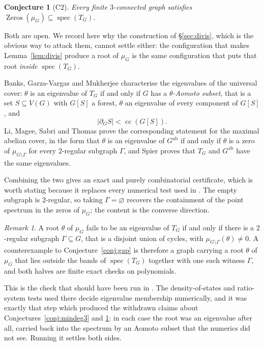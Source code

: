 \documentclass[11pt]{article}
\newtheorem{conjecture}[theorem]{Conjecture}
\theoremstyle{remark}
\newtheorem{remark}[theorem]{Remark}
\begin{document}
\begin{conjecture}[C2]\label{conj:c2}
Every finite $3$-connected graph satisfies
$\operatorname{Zeros}(\mu_G)\subseteq\operatorname{spec}(T_G)$.
\end{conjecture}

Both are open. We record here why the construction of \S\ref{sec:divis}, which is the obvious way to
attack them, cannot settle either: the configuration that makes Lemma~\ref{lem:divis} produce a root
of $\mu_G$ is the same configuration that puts that root \emph{inside} $\operatorname{spec}(T_G)$.

Banks, Garza-Vargas and Mukherjee \cite{BGM} characterise the eigenvalues of the universal cover:
$\theta$ is an eigenvalue of $T_G$ if and only if $G$ has a \emph{$\theta$-Aomoto subset}, that is a
set $S\subseteq V(G)$ with $G[S]$ a forest, $\theta$ an eigenvalue of every component of $G[S]$, and
\[
  |\partial_G S|<\operatorname{cc}(G[S]).
\]
Li, Magee, Sabri and Thomas \cite{LMST} prove the corresponding statement for the maximal abelian
cover, in the form that $\theta$ is an eigenvalue of $G^{\mathrm{ab}}$ if and only if $\theta$ is a
zero of $\mu_{G\setminus\Gamma}$ for every $2$-regular subgraph $\Gamma$, and Spier \cite{Sp} proves
that $T_G$ and $G^{\mathrm{ab}}$ have the same eigenvalues.

Combining the two gives an exact and purely combinatorial certificate, which is worth stating
because it replaces every numerical test used in \cite{Supp}. The empty subgraph is $2$-regular, so
taking $\Gamma=\varnothing$ recovers the containment of the point spectrum in the zeros of $\mu_G$;
the content is the converse direction.

\begin{remark}\label{rem:certificate}
A root $\theta$ of $\mu_G$ fails to be an eigenvalue of $T_G$ if and only if there is a $2$-regular
subgraph $\Gamma\subseteq G$, that is a disjoint union of cycles, with $\mu_{G\setminus\Gamma}(\theta)\ne0$.
A counterexample to Conjecture~\ref{conj:gap} is therefore a graph carrying a root $\theta$ of
$\mu_G$ that lies outside the bands of $\operatorname{spec}(T_G)$ together with one such witness
$\Gamma$, and both halves are finite exact checks on polynomials.
\end{remark}

This is the check that should have been run in \cite{Supp}. The density-of-states and ratio-system
tests used there decide eigenvalue membership numerically, and it was exactly that step which
produced the withdrawn claims about Conjectures~\ref{conj:mindeg3} and \ref{conj:c2}: in each
case the root was an eigenvalue after all, carried back into the spectrum by an Aomoto subset that
the numerics did not see. Running it settles both sides.
\end{document}
